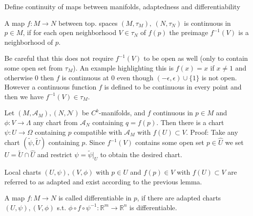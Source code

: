 Define continuity of maps between manifolds, adaptedness and differentiability

A map \( f : M \to N \) between top. spaces \( (M, \tau_M),\ (N, \tau_N) \) is continuous in \( p \in M \), if for each open neighborhood \( V \in \tau_N\) 
of \( f(p) \) the preimage \( f^{-1}(V) \) is a neighborhood of \( p \).

Be careful that this does not require \( f^{-1}(V) \) to be open as well (only to contain some open set from \( \tau_M \)).
An example highlighting this is \( f(x) = x \) if \( x \neq 1 \) and otherwise \( 0 \) then \( f \) is continuous at \( 0 \) even though
\( (-\epsilon, \epsilon) \cup \{1\} \) is not open.
However a continuous function \( f \) is defined to be continuous in every point and then we have \( f^{-1}(V) \in \tau_M \).

Let \( (M, \mathcal{A}_M), (N, \mathcal{N}) \) be \( C^k \)-manifolds, and \( f \) continuous in \( p \in M \) and \( \phi : V \to \Lambda \)
any chart from \( \mathcal{A}_N \) containing \( q = f(p) \). Then there is a chart \( \psi: U \to \Omega \) containing \( p \) compatible with \( \mathcal{A}_M \) 
with \( f(U) \subset V \).
Proof:
Take any chart \( (\tilde{\psi}, \tilde{U}) \) containing \( p \). Since \( f^{-1}(V) \) contains some open set \( p \in \hat{U} \) we set \( U = \tilde{U} \cap \hat{U} \)
and restrict \( \psi = \tilde{\psi}|_{U} \) to obtain the desired chart.

Local charts \( (U, \psi), (V, \phi) \) with \( p \in U \) and \( f(p) \in V \) with \( f(U) \subset V \) are referred to as adapted and exist according to the previous lemma.

A map \( f : M \to N \) is called differentiable in \( p \), if there are adapted charts \( (U, \psi), (V, \phi) \) s.t.
\( \phi \circ f \circ \psi^{-1} : \mathbb{R}^m \to \mathbb{R}^n \) is differentiable.
